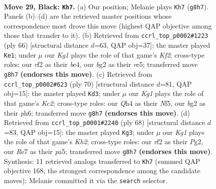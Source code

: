 \documentclass[11pt]{article}
\begin{document}
\clearpage

\begin{figure}[p]\centering
\begin{subfigure}{0.46\textwidth}\centering
\resizebox{\linewidth}{!}{%
\newchessgame
\chessboard[
  setfen={Q5k1/p3r3/p3p1p1/7P/7q/1N6/1P3RB1/2B3K1 b - - 0 29},
  showmover=false,
  pgfstyle=straightmove, color=movearrow, markmove={g8-h7}
]}
\caption{}
\end{subfigure}\hfill
\begin{subfigure}{0.46\textwidth}\centering
\resizebox{\linewidth}{!}{%
\newchessgame
\chessboard[
  setfen={1R6/p4B1k/7p/4r1p1/3Qb1P1/4P3/P1q2K1P/8 w - - 3 34},
  showmover=false,
  pgfstyle=straightmove, color=movearrow, markmove={f2-e1}
]}
\caption{}
\end{subfigure}
\\[4pt]
\begin{subfigure}{0.46\textwidth}\centering
\resizebox{\linewidth}{!}{%
\newchessgame
\chessboard[
  setfen={r7/2Q3bk/7p/p4N2/8/8/1qKR1PPP/8 w - - 0 36},
  showmover=false,
  pgfstyle=straightmove, color=movearrow, markmove={c2-d3}
]}
\caption{}
\end{subfigure}\hfill
\begin{subfigure}{0.46\textwidth}\centering
\resizebox{\linewidth}{!}{%
\newchessgame
\chessboard[
  setfen={8/6pk/2p1Q3/p1bpP1B1/7P/8/P1P3PK/6q1 w - - 3 35},
  showmover=false,
  pgfstyle=straightmove, color=movearrow, markmove={h2-g3}
]}
\caption{}
\end{subfigure}
\caption{\textbf{Move 29, Black: \texttt{Kh7}.} (a) Our position; Melanie plays \texttt{Kh7} (\texttt{g8h7}). Panels (b)--(d) are the retrieved master positions whose correspondence most drove this move (highest QAP objective among those that transfer to it). (b) Retrieved from \texttt{ccrl\_top\_p0002\#1223} (ply 66) [structural distance $d$=63, QAP obj=37]: the master played \texttt{Ke1}; under $\mu$ our \emph{Kg1} plays the role of that game's \emph{Kf2}; cross-type roles: our \emph{r}f2 as their \emph{b}e4, our \emph{b}g2 as their \emph{r}e5; transferred move \texttt{g8h7} \textbf{(endorses this move)}. (c) Retrieved from \texttt{ccrl\_top\_p0002\#623} (ply 70) [structural distance $d$=81, QAP obj=15]: the master played \texttt{Kd3}; under $\mu$ our \emph{Kg1} plays the role of that game's \emph{Kc2}; cross-type roles: our \emph{Q}h4 as their \emph{N}f5, our \emph{b}g2 as their \emph{p}h6; transferred move \texttt{g8h7} \textbf{(endorses this move)}. (d) Retrieved from \texttt{ccrl\_top\_p0001\#2240} (ply 68) [structural distance $d$=83, QAP obj=15]: the master played \texttt{Kg3}; under $\mu$ our \emph{Kg1} plays the role of that game's \emph{Kh2}; cross-type roles: our \emph{r}f2 as their \emph{P}g2, our \emph{R}e7 as their \emph{p}a5; transferred move \texttt{g8h7} \textbf{(endorses this move)}. Synthesis: 11 retrieved analogs transferred to \texttt{Kh7} (summed QAP objective 168, the strongest correspondence among the candidate moves); Melanie committed it via the \texttt{search} selector.}
\label{fig:thought-m57}
\end{figure}
\end{document}
